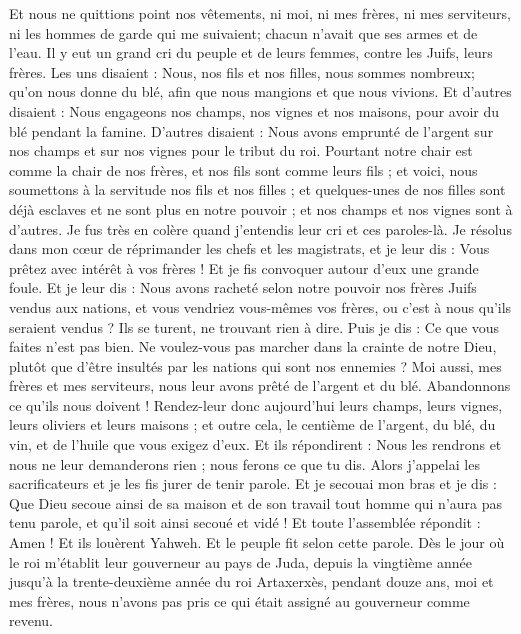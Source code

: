 \begin{multicols}{2}
Et nous ne quittions point nos vêtements, ni moi, ni mes frères, ni mes serviteurs, ni les hommes de garde qui me suivaient; chacun n'avait que ses armes et de l'eau.
\VerseOne{}Il y eut un grand cri du peuple et de leurs femmes, contre les Juifs, leurs frères.
Les uns disaient : Nous, nos fils et nos filles, nous sommes nombreux; qu'on nous donne du blé, afin que nous mangions et que nous vivions.
Et d’autres disaient : Nous engageons nos champs, nos vignes et nos maisons, pour avoir du blé pendant la famine.
D’autres disaient : Nous avons emprunté de l'argent sur nos champs et sur nos vignes pour le tribut du roi.
Pourtant notre chair est comme la chair de nos frères, et nos fils sont comme leurs fils ; et voici, nous soumettons à la servitude nos fils et nos filles ; et quelques-unes de nos filles sont déjà esclaves et ne sont plus en notre pouvoir ; et nos champs et nos vignes sont à d'autres.
Je fus très en colère quand j'entendis leur cri et ces paroles-là.
Je résolus dans mon cœur de réprimander les chefs et les magistrats, et je leur dis : Vous prêtez avec intérêt à vos frères ! Et je fis convoquer autour d’eux une grande foule.
Et je leur dis : Nous avons racheté selon notre pouvoir nos frères Juifs vendus aux nations, et vous vendriez vous-mêmes vos frères, ou c'est à nous qu'ils seraient vendus ? Ils se turent, ne trouvant rien à dire.
Puis je dis : Ce que vous faites n’est pas bien. Ne voulez-vous pas marcher dans la crainte de notre Dieu, plutôt que d'être insultés par les nations qui sont nos ennemies ?
Moi aussi, mes frères et mes serviteurs, nous leur avons prêté de l'argent et du blé. Abandonnons ce qu'ils nous doivent !
Rendez-leur donc aujourd'hui leurs champs, leurs vignes, leurs oliviers et leurs maisons ; et outre cela, le centième de l'argent, du blé, du vin, et de l'huile que vous exigez d'eux.
Et ils répondirent : Nous les rendrons et nous ne leur demanderons rien ; nous ferons ce que tu dis. Alors j'appelai les sacrificateurs et je les fis jurer de tenir parole.
Et je secouai mon bras et je dis : Que Dieu secoue ainsi de sa maison et de son travail tout homme qui n'aura pas tenu parole, et qu'il soit ainsi secoué et vidé ! Et toute l'assemblée répondit : Amen ! Et ils louèrent Yahweh. Et le peuple fit selon cette parole.
Dès le jour où le roi m'établit leur gouverneur au pays de Juda, depuis la vingtième année jusqu'à la trente-deuxième année du roi Artaxerxès, pendant douze ans, moi et mes frères, nous n'avons pas pris ce qui était assigné au gouverneur comme revenu.

\end{multicols}
